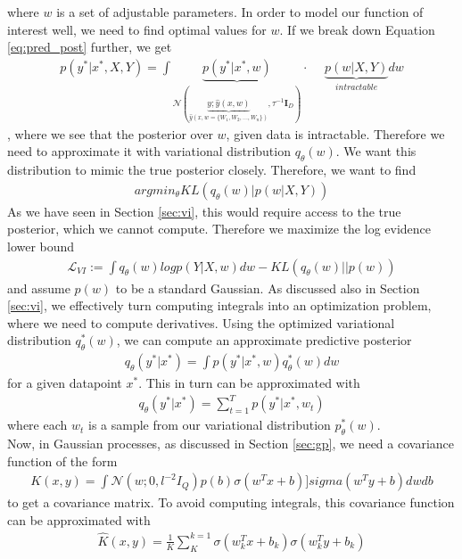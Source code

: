 \documentclass[a4paper,cleardoubleempty,BCOR1cm, 11pt]{report}
\begin{document}
where $w$ is a set of adjustable parameters. In order to model our function of interest well, we need to find optimal values for $w$. If we break down Equation \ref{eq:pred_post} further, we get
\begin{align}
p(y^*|x^*, X,Y) = \int \underbrace{p(y^*|x^*,w)}_{\mathcal{N}(\underbrace{y;\hat{y}(x,w)}_{\hat{y}(x, w=\lbrace W_1, W_2,...,W_n\rbrace)},\tau^{-1}\mathbf{I}_D)} \cdot \hspace{15pt}\underbrace{p(w|X,Y)}_{intractable}dw
\end{align}
, where we see that the posterior over $w$, given data is intractable. Therefore we need to approximate it with variational distribution $q_{\theta}(w)$. We want this distribution to mimic the true posterior closely. Therefore, we want to find
\begin{align*}
	argmin_{\theta} KL(q_{\theta}(w)|p(w|X,Y))
\end{align*}
As we have seen in Section \ref{sec:vi}, this would require access to the true posterior, which we cannot compute. Therefore we maximize the log evidence lower bound
\begin{align*}
\mathcal{L}_{VI} := \int q_{\theta}(w) log p (Y|X, w)dw - KL(q_{\theta}(w)||p(w))
\end{align*}
and assume $p(w)$ to be a standard Gaussian. As discussed also in Section \ref{sec:vi}, we effectively turn computing integrals into an optimization problem, where we need to compute derivatives. Using the optimized variational distribution $q_{\theta}^*(w)$, we can compute an approximate predictive posterior 
\begin{align*}
q_{\theta}(y^*|x^*) = \int p(y^*|x^*, w)q_{\theta}^*(w)dw
\end{align*}
for a given datapoint $x^*$. This in turn can be approximated with
\begin{align*}
q_{\theta}(y^*|x^*) = \sum_{t=1}^{T}p(y^*|x^*, w_t)
\end{align*}
where each $w_t$ is a sample from our variational distribution $p_{\theta}^*(w)$.
\\
Now, in Gaussian processes, as discussed in Section \ref{sec:gp}, we need a covariance function of the form 
\begin{align*}
K(x,y) = \int \mathcal{N}(w;0, l^{-2} I_Q)p(b)\sigma(w^Tx+b)]sigma(w^Ty +b)dwdb
\end{align*}
to get a covariance matrix. To avoid computing integrals, this covariance function can be approximated with
\begin{align*}
	\hat{K}(x,y) = \frac{1}{K} \sum_{K}^{k=1} \sigma(w^T_k x + b_k)\sigma(w^T_k y + b_k)
\end{align*}
\end{document}
